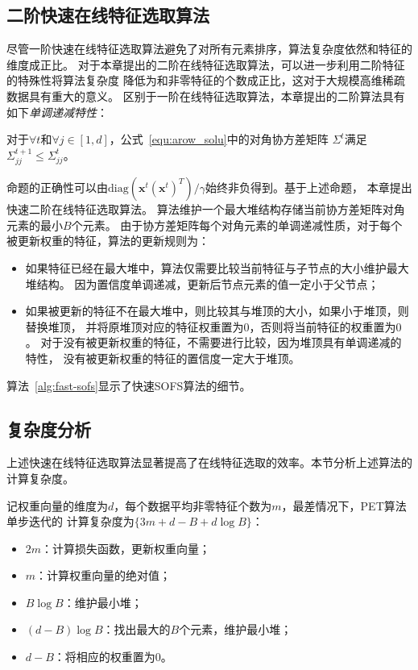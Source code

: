 \documentclass[doctor]{ustcthesis}
\def \x {\mathbf{x}}
\def \diag{\mathrm{diag}}
\begin{document}
\subsection{二阶快速在线特征选取算法}
尽管一阶快速在线特征选取算法避免了对所有元素排序，算法复杂度依然和特征的维度成正比。
对于本章提出的二阶在线特征选取算法，可以进一步利用二阶特征的特殊性将算法复杂度
降低为和非零特征的个数成正比，这对于大规模高维稀疏数据具有重大的意义。
区别于一阶在线特征选取算法，本章提出的二阶算法具有如下\emph{单调递减特性}：
\vspace{-0.5em}
\begin{proposition}[单调递减性]\label{prop:sofs}
    对于$\forall t$和$\forall j\in[1,d]$，公式~\eqref{equ:arow_solu}中的对角协方差矩阵
    $\Sigma^t$满足$\Sigma_{jj}^{t+1} \leq \Sigma_{jj}^t$。
\end{proposition}
\vspace{-0.5em}
命题的正确性可以由$\diag{(\x^t(\x^t)^T)}/\gamma$始终非负得到。基于上述命题，
本章提出快速二阶在线特征选取算法。
算法维护一个最大堆结构存储当前协方差矩阵对角元素的最小$B$个元素。
由于协方差矩阵每个对角元素的单调递减性质，对于每个被更新权重的特征，算法的更新规则为：
\vspace{-0.5em}
\begin{itemize}\setlength{\itemsep}{-0.5em}
    \item 如果特征已经在最大堆中，算法仅需要比较当前特征与子节点的大小维护最大堆结构。
        因为置信度单调递减，更新后节点元素的值一定小于父节点；
    \item 如果被更新的特征不在最大堆中，则比较其与堆顶的大小，如果小于堆顶，则替换堆顶，
        并将原堆顶对应的特征权重置为$0$，否则将当前特征的权重置为$0$。
        对于没有被更新权重的特征，不需要进行比较，因为堆顶具有单调递减的特性，
        没有被更新权重的特征的置信度一定大于堆顶。
\end{itemize}

\vspace{-1em}
算法~\ref{alg:fast-sofs}显示了快速SOFS算法的细节。

\vspace{-1em}
\subsection{复杂度分析}
\label{sec:sofs-complexity}
上述快速在线特征选取算法显著提高了在线特征选取的效率。本节分析上述算法的计算复杂度。

记权重向量的维度为$d$，每个数据平均非零特征个数为$m$，最差情况下，PET算法单步迭代的
计算复杂度为$\{3m+d-B+d\log B\}$：
\vspace{-0.8em}
\begin{itemize}\setlength{\itemsep}{-0.5em}
    \item $2m$：计算损失函数，更新权重向量；
    \item $m$：计算权重向量的绝对值；
    \item $B\log B$：维护最小堆；
    \item $(d-B)\log B$：找出最大的$B$个元素，维护最小堆；
    \item $d-B$：将相应的权重置为$0$。
\end{itemize}
\end{document}
